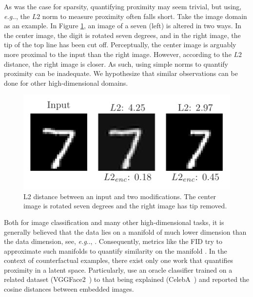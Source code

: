 \documentclass[11pt,a4paper,twoside,openright,final]{memoir}
\makeatletter
\DeclareRobustCommand\onedot{\futurelet\@let@token\@onedot}
\def\@onedot{\ifx\@let@token.\else.\null\fi\xspace}
\def\eg{\emph{e.g}\onedot} \def\Eg{\emph{E.g}\onedot}
\newcommand*{\paperref}[1]{Paper~\hyperref[#1]{\ref{#1}}}
\makeatother
\begin{document}
As was the case for sparsity, quantifying proximity may seem trivial, but using, \eg, the $L2$ norm to measure proximity often falls short.
Take the image domain as an example.
In Figure \ref{fig:l2-example}, an image of a seven (left) is altered in two ways. 
In the center image, the digit is rotated seven degrees, and in the right image, the tip of the top line has been cut off.
Perceptually, the center image is arguably more proximal to the input than the right image.
However, according to the $L2$ distance, the right image is closer.
As such, using simple norms to quantify proximity can be inadequate.
We hypothesize that similar observations can be done for other high-dimensional domains.

\begin{figure}
    \centering
    \includegraphics[trim={0, 17, 0, 0}, clip]{graphics/l2-example.pdf}
    \caption{L2 distance between an input and two modifications. The center image is rotated seven degrees and the right image has tip removed.}
    \label{fig:l2-example}
\end{figure}

Both for image classification and many other high-dimensional tasks, it is generally believed that the data lies on a manifold of much lower dimension than the data dimension, see, \eg, \cite[Sec. 3.11.3]{Goodfellow-et-al-2016}.
Consequently, metrics like the FID try to approximate such manifolds to quantify similarity on the manifold \cite{fid}.
In the context of counterfactual examples, there exist only one work that quantifies proximity in a latent space.
Particularly, \citet{Rodriguez2021} use an oracle classifier trained on a related dataset (VGGFace2~\cite{vgg2faces}) to that being explained (CelebA~\cite{celeba}) and reported the cosine distances between embedded images.
\end{document}
